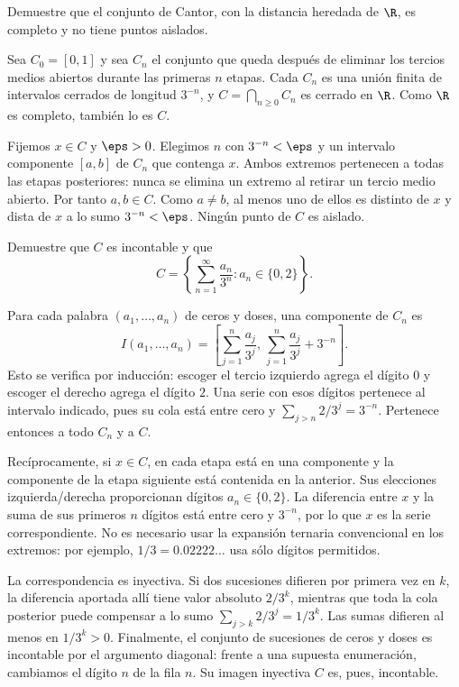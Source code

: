 \begin{ejercicio}
Demuestre que el conjunto de Cantor, con la distancia heredada de $\R$, es completo y no tiene puntos aislados.
\end{ejercicio}
\begin{solucion}
Sea $C_0=[0,1]$ y sea $C_n$ el conjunto que queda después de eliminar los tercios medios abiertos durante las primeras $n$ etapas. Cada $C_n$ es una unión finita de intervalos cerrados de longitud $3^{-n}$, y $C=\bigcap_{n\geq0}C_n$ es cerrado en $\R$. Como $\R$ es completo, también lo es $C$.

Fijemos $x\in C$ y $\eps>0$. Elegimos $n$ con $3^{-n}<\eps$ y un intervalo componente $[a,b]$ de $C_n$ que contenga $x$. Ambos extremos pertenecen a todas las etapas posteriores: nunca se elimina un extremo al retirar un tercio medio abierto. Por tanto $a,b\in C$. Como $a\ne b$, al menos uno de ellos es distinto de $x$ y dista de $x$ a lo sumo $3^{-n}<\eps$. Ningún punto de $C$ es aislado.
\end{solucion}

\begin{ejercicio}
Demuestre que $C$ es incontable y que
\[
 C=\left\{\sum_{n=1}^\infty\frac{a_n}{3^n}:a_n\in\{0,2\}\right\}.
\]
\end{ejercicio}
\begin{solucion}
Para cada palabra $(a_1,\ldots,a_n)$ de ceros y doses, una componente de $C_n$ es
\[
 I(a_1,\ldots,a_n)=\left[\sum_{j=1}^n\frac{a_j}{3^j},\,
 \sum_{j=1}^n\frac{a_j}{3^j}+3^{-n}\right].
\]
Esto se verifica por inducción: escoger el tercio izquierdo agrega el dígito $0$ y escoger el derecho agrega el dígito $2$. Una serie con esos dígitos pertenece al intervalo indicado, pues su cola está entre cero y $\sum_{j>n}2/3^j=3^{-n}$. Pertenece entonces a todo $C_n$ y a $C$.

Recíprocamente, si $x\in C$, en cada etapa está en una componente y la componente de la etapa siguiente está contenida en la anterior. Sus elecciones izquierda/derecha proporcionan dígitos $a_n\in\{0,2\}$. La diferencia entre $x$ y la suma de sus primeros $n$ dígitos está entre cero y $3^{-n}$, por lo que $x$ es la serie correspondiente. No es necesario usar la expansión ternaria convencional en los extremos: por ejemplo, $1/3=0.02222\ldots$ usa sólo dígitos permitidos.

La correspondencia es inyectiva. Si dos sucesiones difieren por primera vez en $k$, la diferencia aportada allí tiene valor absoluto $2/3^k$, mientras que toda la cola posterior puede compensar a lo sumo $\sum_{j>k}2/3^j=1/3^k$. Las sumas difieren al menos en $1/3^k>0$. Finalmente, el conjunto de sucesiones de ceros y doses es incontable por el argumento diagonal: frente a una supuesta enumeración, cambiamos el dígito $n$ de la fila $n$. Su imagen inyectiva $C$ es, pues, incontable.
\end{solucion}

